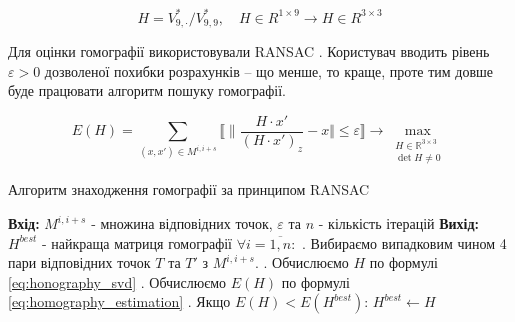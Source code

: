 \begin{equation}
    H = V^{*}_{9,\cdot }/V^{*}_{9,9},\quad H \in R^{1 \times 9} \rightarrow H \in R^{3 \times 3}
    \label{eq:honography_svd}
\end{equation}


Для оцінки гомографії використовували RANSAC \cite{Fischler1981RandomSC}.
Користувач вводить рівень \(\varepsilon > 0\)
дозволеної похибки розрахунків -- що менше, то краще, проте тим довше
буде працювати алгоритм пошуку гомографії.

\begin{equation}
    E(H) = \sum_{(x,x') \in M^{i,i+s}}
    \llbracket \|
    \frac{H\cdot x'}{(H\cdot x')_z} - x
    \Vert \leq \varepsilon
    \rrbracket
    \to \max\limits_{\substack{H \in \mathbb{R}^{3 \times 3} \\ \det{H} \neq 0}}
    \label{eq:homography_estimation}
\end{equation}

\begin{algorithm}[H]
    \caption{Алгоритм знаходження гомографії за принципом RANSAC}
    \begin{algorithmic}
        \State \textbf{Вхід:} $M^{i,i+s}$ - множина відповідних точок, $\varepsilon$ та $n$ - кількість ітерацій
        \State \textbf{Вихід:} $H^{best}$ - найкраща матриця гомографії
        \State $\forall i = \overline{1,n}:$
        \State {}. Вибираємо випадковим чином 4 пари відповідних точок $T$ та $T'$ з $M^{i,i+s}$.
        \State {}. Обчислюємо $H$ по формулі \ref{eq:honography_svd}
        \State {}. Обчислюємо $E(H)$ по формулі \ref{eq:homography_estimation}
        \State {}. Якщо  $E(H) < E(H^{best})$:
        \State \quad \quad $H^{best} \gets H$
    \end{algorithmic}
\end{algorithm}